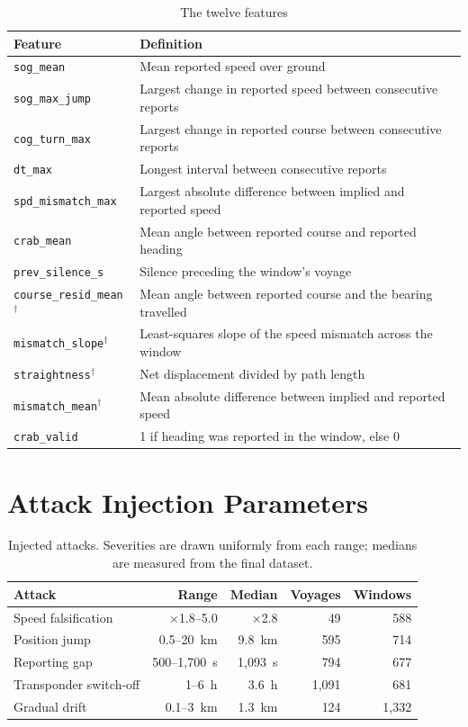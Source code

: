 \documentclass[journal]{IEEEtran}
\begin{document}
\begin{table}[!h]
\centering
\footnotesize
\setlength{\tabcolsep}{4pt}
\caption{The twelve features}
\label{tab:featdefs}
\begin{tabular}{@{}p{}p{}@{}}
\toprule
Feature & Definition \\
\midrule
\texttt{sog\_mean} & Mean reported speed over ground \\
\texttt{sog\_max\_jump} & Largest change in reported speed between consecutive reports \\
\texttt{cog\_turn\_max} & Largest change in reported course between consecutive reports \\
\texttt{dt\_max} & Longest interval between consecutive reports \\
\texttt{spd\_mismatch\_max} & Largest absolute difference between implied and reported speed \\
\texttt{crab\_mean} & Mean angle between reported course and reported heading \\
\texttt{prev\_silence\_s} & Silence preceding the window's voyage \\
\texttt{course\_resid\_mean}$^\dagger$ & Mean angle between reported course and the bearing travelled \\
\texttt{mismatch\_slope}$^\dagger$ & Least-squares slope of the speed mismatch across the window \\
\texttt{straightness}$^\dagger$ & Net displacement divided by path length \\
\texttt{mismatch\_mean}$^\dagger$ & Mean absolute difference between implied and reported speed \\
\texttt{crab\_valid} & 1 if heading was reported in the window, else 0 \\
\bottomrule
\end{tabular}
\end{table}

\section{Attack Injection Parameters}
\label{app:attacks}

\begin{table}[!h]
\centering
\footnotesize
\setlength{\tabcolsep}{4pt}
\caption{Injected attacks. Severities are drawn uniformly from each range;
medians are measured from the final dataset.}
\label{tab:attackparams}
\begin{tabular}{@{}lrrrr@{}}
\toprule
Attack & Range & Median & Voyages & Windows \\
\midrule
Speed falsification & $\times$1.8--5.0 & $\times$2.8 & 49 & 588 \\
Position jump & 0.5--20~km & 9.8~km & 595 & 714 \\
Reporting gap & 500--1,700~s & 1,093~s & 794 & 677 \\
Transponder switch-off & 1--6~h & 3.6~h & 1,091 & 681 \\
Gradual drift & 0.1--3~km & 1.3~km & 124 & 1,332 \\
\bottomrule
\end{tabular}
\end{table}
\end{document}
